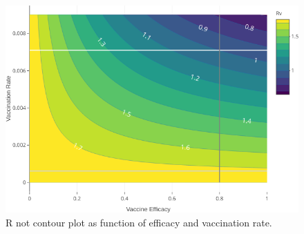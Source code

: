 \begin{figure}[tbh]
    \centering
    \includegraphics[scale=2.1, keepaspectratio]{Figures/R0_contour_1}
    \caption{R not contour plot as function of efficacy and vaccination rate.}
    \label{fig:r0contour1}
\end{figure}


